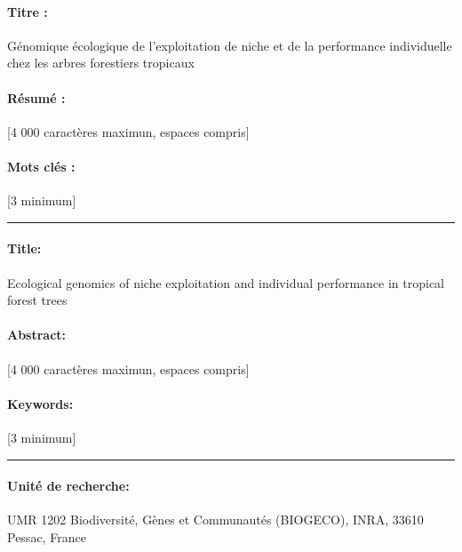 \newpage
\normalsize{
\paragraph{Titre :}
Génomique écologique de l'exploitation de niche et de la performance individuelle chez les arbres forestiers tropicaux
\paragraph{Résumé :}
[4 000 caractères maximun, espaces compris]
\paragraph{Mots clés :}
[3 minimum]
\vspace*{\fill}
\newline\noindent\rule{\textwidth}{1pt}
\paragraph{Title:} 
Ecological genomics of niche exploitation and individual performance in tropical forest trees
\paragraph{Abstract:}
[4 000 caractères maximun, espaces compris]
\paragraph{Keywords:} 
[3 minimum]
\vspace*{\fill}
\newline\noindent\rule{\textwidth}{1pt}
\paragraph{Unité de recherche:} UMR 1202 Biodiversité, Gènes et Communautés (BIOGECO), INRA, 33610 Pessac, France
}